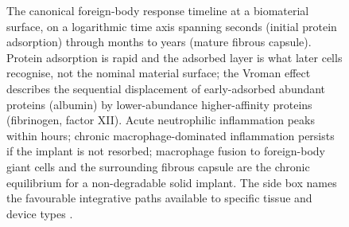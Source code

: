 \begin{figure}[htbp]
\begin{tikzpicture}[
  phase/.style={draw=engblack, minimum height=1.0cm, align=center,
    font=\small},
  label/.style={font=\scriptsize\itshape, anchor=south, align=center},
]
\end{tikzpicture}
\caption[Host-response timeline]{The canonical foreign-body
response timeline at a biomaterial surface, on a logarithmic time
axis spanning seconds (initial protein adsorption) through months
to years (mature fibrous capsule). Protein adsorption is rapid
and the adsorbed layer is what later cells recognise, not the
nominal material surface; the Vroman effect describes the
sequential displacement of early-adsorbed abundant proteins
(albumin) by lower-abundance higher-affinity proteins (fibrinogen,
factor XII). Acute neutrophilic inflammation peaks within hours;
chronic macrophage-dominated inflammation persists if the implant
is not resorbed; macrophage fusion to foreign-body giant cells
and the surrounding fibrous capsule are the chronic equilibrium
for a non-degradable solid implant. The side box names the
favourable integrative paths available to specific tissue and
device types
\cite{paper:v6c12-anderson-foreign-body-2008,
paper:v6c12-vroman-effect-1969,
text:v6c12-ratner-biomaterials-2020}.}
\label{fig:vol06:ch12:host-response-timeline}
\end{figure}
